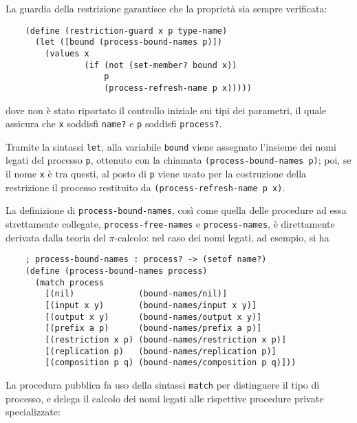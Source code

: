 La guardia della restrizione garantisce che la propriet\`a sia sempre
verificata:

\begin{lstlisting}
    (define (restriction-guard x p type-name)
      (let ([bound (process-bound-names p)])
        (values x
                (if (not (set-member? bound x))
                    p
                    (process-refresh-name p x)))))
\end{lstlisting}

dove non \`e stato riportato il controllo iniziale sui tipi dei parametri,
il quale assicura che \lstinline{x} soddisfi \lstinline{name?} e
\lstinline{p} soddisfi \lstinline{process?}.

Tramite la sintassi \lstinline{let}, alla variabile \lstinline{bound} viene
assegnato l'insieme dei nomi legati del processo \lstinline{p}, ottenuto
con la chiamata \lstinline{(process-bound-names p)}; poi, se il nome
\lstinline{x} \`e tra questi, al posto di \lstinline{p} viene usato per la
costruzione della restrizione il processo restituito da
\lstinline{(process-refresh-name p x)}.

La definizione di \lstinline{process-bound-names}, cos\`i come quella delle
procedure ad essa strettamente collegate, \lstinline{process-free-names} e
\lstinline{process-names}, \`e direttamente derivata dalla teoria del
$\pi$-calcolo: nel caso dei nomi legati, ad esempio, si ha

\begin{lstlisting}
    ; process-bound-names : process? -> (setof name?)
    (define (process-bound-names process)
      (match process
        [(nil)             (bound-names/nil)]
        [(input x y)       (bound-names/input x y)]
        [(output x y)      (bound-names/output x y)]
        [(prefix a p)      (bound-names/prefix a p)]
        [(restriction x p) (bound-names/restriction x p)]
        [(replication p)   (bound-names/replication p)]
        [(composition p q) (bound-names/composition p q)]))
\end{lstlisting}

La procedura pubblica fa uso della sintassi \lstinline{match} per distinguere
il tipo di processo, e delega il calcolo dei nomi legati alle rispettive
procedure private specializzate:

